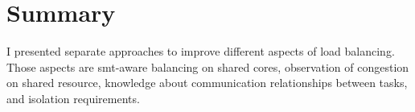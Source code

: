 \section{Summary}
\label{state:summary}

\begin{comment}
After I introduce the reader to relevant terminology, I present related
research about symbiotic \gls{smt} co-schedules and the problem of accurately
measuring the performance of a specific co-schedule.
The prime are of application for load balancing is resource congestion. Research by
\citeauthor{knauerhase_using_2008}, \citeauthor{banikazemi_pam_2008}, and
\citeauthor{zhuravlev_addressing_2012} shows that separating application
competing for cache and memory decreases and stabilises their execution times.
The research presents \gls{llc} misses of an application as indicator for
memory usage and stress put on the memory subsystem.

\cite{hofmeyr_load_2010} balances a single application with several threads.
When all threads reach a synchronization barrier and they communicate their
results.
Hence, the slowest thread lets all other threads wait.
The authors develop a model to provide each thread with equal progress
opportunity.
The knowledge of this communication relationship determines the decision of
the load balancer.

Computations are reflected in cache usage of an application.
PRIME+PROBE attacks analyse the usage of cache lines of the targeted
application and can rebuild a cryptographic secret from the observations.
Placing security critical tasks on other cores than possible attackers, reduces
the amount of cache shared, hence raises the bar for an attack.
\\

In difference to the related work, the goal in this thesis is to design and
implement a load balancer, which mainly uses online measurements to decide on a
thread-to-core mapping.
Also, it should consider communication relationships and security requirements.
While previous research uses \gls{cmp} style processors, I use a \gls{smp} type
processor.
\Gls{cmp} is more similar to a multi-socket system, due to the separated
\gls{llc} between two processors on one die.
\end{comment}

I presented separate approaches to improve different aspects of load balancing.
Those aspects are \gls{smt}-aware balancing on shared cores, observation of
congestion on shared resource, knowledge about communication relationships
between tasks, and isolation requirements.

